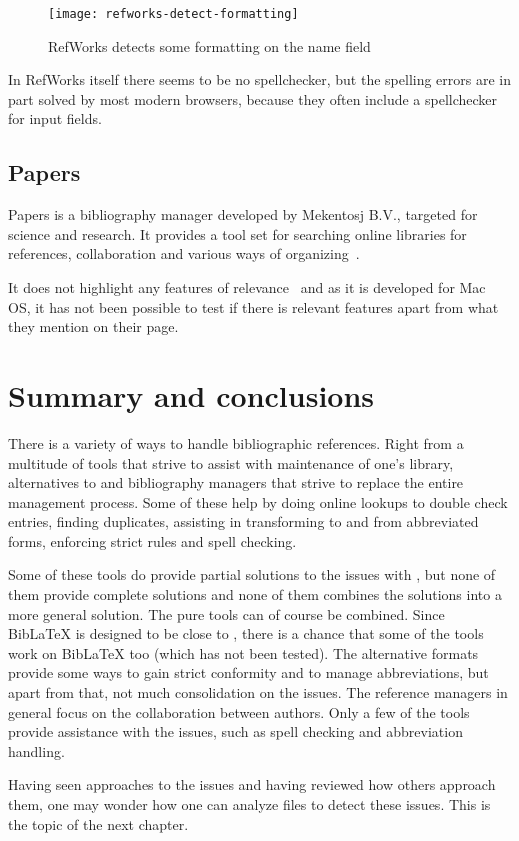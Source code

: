 \begin{figure}
    \centering
    \texttt{[image: refworks-detect-formatting]}
    \caption{RefWorks detects some formatting on the name field}
    \label{fig:refworks-detect-formatting}
\end{figure}

In RefWorks itself there seems to be no spellchecker, but the spelling
errors are in part solved by most modern browsers, because they often
include a spellchecker for input fields.

\subsection{Papers}
Papers is a bibliography manager developed by Mekentosj B.V., targeted
for science and research.  It provides a tool set for searching online
libraries for references, collaboration and various ways of
organizing~\cite{papers_features}.

It does not highlight any features of relevance~\cite{papers_features}
and as it is developed for Mac OS, it has not been possible to test if
there is relevant features apart from what they mention on their page.




\section{Summary and conclusions}
There is a variety of ways to handle bibliographic references.  Right
from a multitude of tools that strive to assist with maintenance of
one's {\bibtex} library, alternatives to {\bibtex} and bibliography
managers that strive to replace the entire management process.  Some
of these help by doing online lookups to double check entries, finding
duplicates, assisting in transforming to and from abbreviated forms,
enforcing strict rules and spell checking.

Some of these tools do provide partial solutions to the issues with
{\bibtex}, but none of them provide complete solutions and none of
them combines the solutions into a more general solution.  The pure
{\bibtex} tools can of course be combined.  Since Bib{\LaTeX} is
designed to be close to {\bibtex}, there is a chance that some of the
{\bibtex} tools work on Bib{\LaTeX} too (which has not been tested).
The alternative formats provide some ways to gain strict conformity
and to manage abbreviations, but apart from that, not much
consolidation on the issues.  The reference managers in general focus
on the collaboration between authors.  Only a few of the tools provide
assistance with the issues, such as spell checking and abbreviation
handling.

Having seen approaches to the {\bibtex} issues and having reviewed how
others approach them, one may wonder how one can analyze {\bibtex}
files to detect these issues.  This is the topic of the next chapter.

